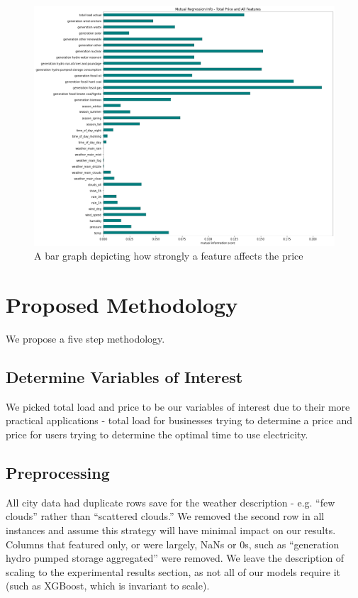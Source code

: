 \documentclass[10pt]{article}
\begin{document}
\begin{figure}[ht]
    \centering
    \includegraphics[scale=0.55]{feature_importances.png}
    \caption{A bar graph depicting how strongly a feature affects the price}
    \label{featureImportances1}
\end{figure}

\section{Proposed Methodology}\label{sec:4}
We propose a five step methodology.

\subsection{Determine Variables of Interest}
We picked total load and price to be our variables of interest due to their more practical applications - total load for businesses trying to determine a price and price for users trying to determine the optimal time to use electricity.

\subsection{Preprocessing}
All city data had duplicate rows save for the weather description - e.g. “few clouds” rather than “scattered clouds.” We removed the second row in all instances and assume this strategy will have minimal impact on our results. Columns that featured only, or were largely, NaNs or 0s, such as “generation hydro pumped storage aggregated” were removed. We leave the description of scaling to the experimental results section, as not all of our models require it (such as XGBoost, which is invariant to scale). 
\end{document}
